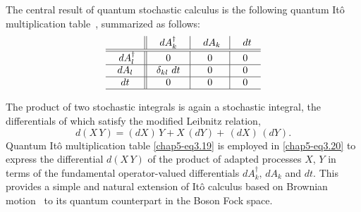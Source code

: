 The central result of quantum stochastic calculus is the following quantum It{\^o}  multiplication table~\cite{key7, key8}, summarized as follows: 
\begin{equation}    
\begin{tabular}{c||c|c|c}
&\hskip 0.1in $dA^\dag_k \hskip 0.1in$   &\hskip 0.1in $dA_k$ \hskip 0.1in & \hskip 0.1in $dt$ \hskip 0.1in \\ 
\hline 
\hline
\hskip 0.1in $dA^\dag_l$ \hskip 0.1in & 0 & 0 & 0 \\ 
\hline 
$dA_l$ & $\delta_{kl}\ dt$ & 0 & 0 \\ 
\hline 
$dt$ & 0 & 0 & 0 \\ 
\hline
\end{tabular}\label{chap5-eq3.19}
\end{equation}

The product of two stochastic integrals is again a stochastic integral, the  differentials of which satisfy the modified Leibnitz relation, 
\begin{equation}
d(X\,Y)= (dX)\, Y+ X\, (dY)+\, (dX)\, (dY).  \label{chap5-eq3.20}  
\end{equation} 
Quantum It\^{o} multiplication table \eqref{chap5-eq3.19}  is employed in \eqref{chap5-eq3.20} to express the differential $d(X\,Y)$ of the product of  adapted processes $X$, $Y$ in terms of the fundamental operator-valued differentials $dA^\dag_k,\, dA_k$ and $dt$.  This provides a simple and natural extension of It\^{o}  calculus based on Brownian motion~\cite{key38} to  its quantum counterpart in the Boson Fock space. 

